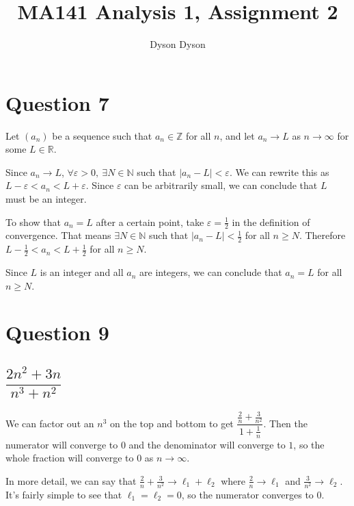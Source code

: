 \documentclass[a4paper]{article}
\title{MA141 Analysis 1, Assignment 2}
\author{Dyson Dyson}
\date{}
\renewcommand{\thesubsection}{Q\thesection~(\roman{subsection})}
\begin{document}
\maketitle

\setlength{\parindent}{0em}
\setlength{\parskip}{1em}


\section*{Question 7}

Let $(a_n)$ be a sequence such that $a_n \in \mathbb Z$ for all $n$, and let $a_n \to L$ as $n \to \infty$ for some $L \in \mathbb R$.

Since $a_n \to L$, $\forall \varepsilon > 0,\ \exists N \in \mathbb N$ such that $|a_n - L| < \varepsilon$. We can rewrite this as $L - \varepsilon < a_n < L + \varepsilon$. Since $\varepsilon$ can be arbitrarily small, we can conclude that $L$ must be an integer.

To show that $a_n = L$ after a certain point, take $\varepsilon = \frac12$ in the definition of convergence. That means $\exists N \in \mathbb N$ such that $|a_n - L| < \frac12$ for all $n \ge N$. Therefore $L - \frac12 < a_n < L + \frac12$ for all $n \ge N$.

Since $L$ is an integer and all $a_n$ are integers, we can conclude that $a_n = L$ for all $n \ge N$.


\section*{Question 9}
\setcounter{section}{9}
\setcounter{subsection}{0}

\renewcommand{\thesubsection}{Q\thesection~(\alph{subsection})}

\subsection{$\dfrac{2n^2 + 3n}{n^3 + n^2}$}

We can factor out an $n^3$ on the top and bottom to get $\dfrac{\frac{2}{n} + \frac{3}{n^2}}{1 + \frac{1}{n}}$. Then the numerator will converge to $0$ and the denominator will converge to $1$, so the whole fraction will converge to $0$ as $n \to \infty$.

In more detail, we can say that $\frac2n + \frac3{n^2} \to \ell_1 + \ell_2$ where $\frac2n \to \ell_1$ and $\frac3{n^2} \to \ell_2$. It's fairly simple to see that $\ell_1 = \ell_2 = 0$, so the numerator converges to $0$.
\end{document}

